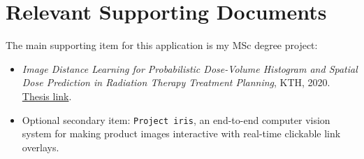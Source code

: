 \documentclass[11pt,a4paper]{article}
\begin{document}
\section*{Relevant Supporting Documents}

The main supporting item for this application is my MSc degree project:

\begin{itemize}
  \item \textit{Image Distance Learning for Probabilistic Dose-Volume Histogram and Spatial Dose Prediction in Radiation Therapy Treatment Planning}, KTH, 2020. \href{https://kth.diva-portal.org/smash/get/diva2:1431327/FULLTEXT02.pdf}{Thesis link}.
  \item Optional secondary item: \texttt{Project iris}, an end-to-end computer vision system for making product images interactive with real-time clickable link overlays.
\end{itemize}
\end{document}
